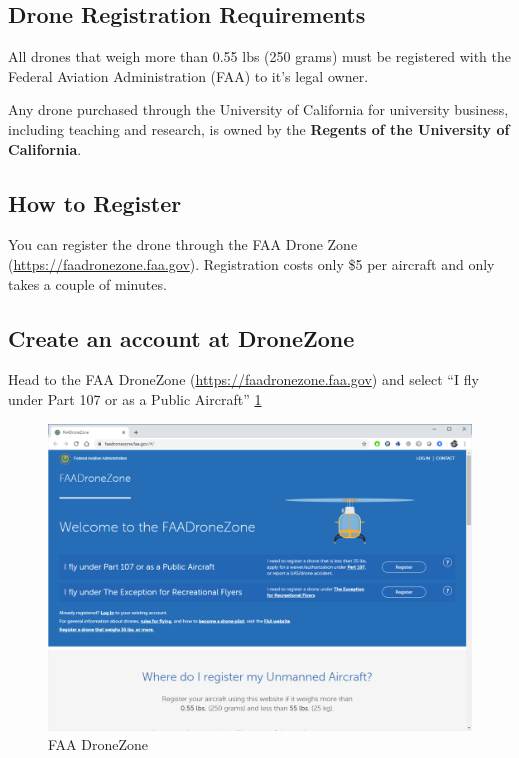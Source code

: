 \documentclass[
  12pt,
]{book}
\begin{document}
\hypertarget{drone-registration-requirements}{%
\subsection{Drone Registration Requirements}\label{drone-registration-requirements}}

All drones that weigh more than 0.55 lbs (250 grams) must be registered with the Federal Aviation Administration (FAA) to it's legal owner.

Any drone purchased through the University of California for university business, including teaching and research, is owned by the \textbf{Regents of the University of California}.

\hypertarget{how-to-register}{%
\subsection{How to Register}\label{how-to-register}}

You can register the drone through the FAA Drone Zone (\url{https://faadronezone.faa.gov}). Registration costs only \$5 per aircraft and only takes a couple of minutes.

\hypertarget{create-an-account-at-dronezone}{%
\subsection{Create an account at DroneZone}\label{create-an-account-at-dronezone}}

Head to the FAA DroneZone (\url{https://faadronezone.faa.gov}) and select ``I fly under Part 107 or as a Public Aircraft'' \ref{fig:reg-page}

\begin{figure}

{\centering \includegraphics[width=0.8\linewidth]{images/reg_site} 

}

\caption{FAA DroneZone}\label{fig:reg-page}
\end{figure}
\end{document}
